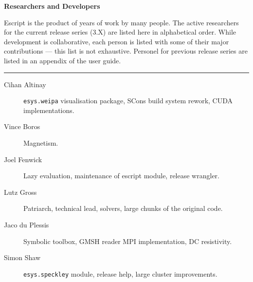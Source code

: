\vbox{}
\vfill
\begin{center}
\textbf{\Large Researchers and Developers}
\vspace{0.5cm}

Escript is the product of years of work by many people.
The active researchers for the current release series (3.X) are listed here in alphabetical order.
While development is collaborative, each person is listed with some of their major contributions --- this list is not exhaustive.
Personel for previous release series are listed in an appendix of the user guide.

\vspace{1cm}
\hrule
\vspace{1cm}
\begin{description}
\item[Cihan Altinay] \texttt{esys.weipa} visualisation package, SCons build system rework, CUDA implementations.
\item[Vince Boros] Magnetism.
\item[Joel Fenwick] Lazy evaluation, maintenance of escript module, release wrangler.
\item[Lutz Gross] Patriarch, technical lead, solvers, large chunks of the original code.
\item[Jaco du Plessis] Symbolic toolbox, GMSH reader MPI implementation, DC resistivity.
\item[Simon Shaw] \texttt{esys.speckley} module, release help, large cluster improvements.
\end{description}
\end{center}
\vfill
\pagebreak


